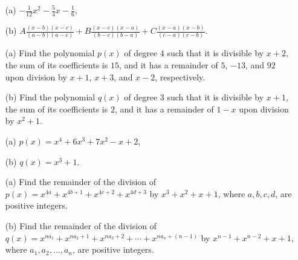 \documentclass[12pt,a4paper]{memoir}
\theoremstyle{definition}
\begin{document}
\begin{solution}[name=Solution by Parviz Shahriari]
	\begin{itemize}
		\item[(a)] $\displaystyle -\frac{1}{12}x^2-\frac{5}{4}x-\frac{1}{6}$,
		\item[(b)] $\displaystyle  A\frac{(x-b)(x-c)}{(a-b)(a-c)} + B\frac{(x-c)(x-a)}{(b-c)(b-a)} + C\frac{(x-a)(x-b)}{(c-a)(c-b)}$.
	\end{itemize}
\end{solution}




\begin{tcolorbox}
	\begin{question}
		\begin{itemize}
			\item[(a)] Find the polynomial $p(x)$ of degree $4$ such that it is divisible by $x+2$, the sum of its coefficients is $15$, and it has a remainder of $5$, $-13$, and $92$ upon division by $x+1$, $x+3$, and $x-2$, respectively.
			\item[(b)] Find the polynomial $q(x)$ of degree $3$ such that it is divisible by $x+1$, the sum of its coefficients is $2$, and it has a remainder of $1-x$ upon division by $x^2+1$.
		\end{itemize}
	\end{question}
\end{tcolorbox}

\begin{solution}[name=Solution by Parviz Shahriari]
	\begin{itemize}
		\item[(a)] $p(x)=x^4+6x^3+7x^2-x+2$,
		\item[(b)] $q(x)=x^3+1$.
	\end{itemize}
\end{solution}



\begin{tcolorbox}
	\begin{question}
		\begin{itemize}
			\item[(a)] Find the remainder of the division of $p(x)=x^{4a} + x^{4b+1} + x^{4c+2} + x^{4d+3}$ by $x^3+x^2+x+1$, where $a,b,c,d$, are positive integers.
			\item[(b)] Find the remainder of the division of $q(x)=x^{na_1} + x^{na_2+1} + x^{na_{3}+2} + \cdots + x^{na_{n}+(n-1)}$ by $x^{n-1}+x^{n-2}+x+1$, where $a_1,a_2,\dots,a_n$, are positive integers.
		\end{itemize}
	\end{question}
\end{tcolorbox}
\end{document}
